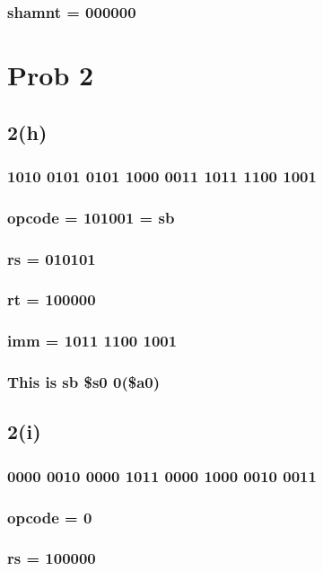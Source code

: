 \documentclass[11pt]{article}
\begin{document}
\subsubsection{shamnt = 000000}
\label{sec:org31a8437}
\section{Prob 2}
\label{sec:org0a354fa}
\subsection{2(h)}
\label{sec:org96f1314}
\subsubsection{1010 0101 0101 1000 0011 1011 1100 1001}
\label{sec:orgfc3d028}
\subsubsection{opcode = 101001 = sb}
\label{sec:org8af76ef}
\subsubsection{rs = 010101}
\label{sec:org305963f}
\subsubsection{rt = 100000}
\label{sec:orgad23dbd}
\subsubsection{imm = 1011 1100 1001}
\label{sec:org52b8803}
\subsubsection{This is sb \$s0 0(\$a0)}
\label{sec:orgb871058}
\subsection{2(i)}
\label{sec:org9ef0fbd}
\subsubsection{0000 0010 0000 1011 0000 1000 0010 0011}
\label{sec:org4b9c534}
\subsubsection{opcode = 0}
\label{sec:org6661af9}
\subsubsection{rs = 100000}
\label{sec:org4111d14}
\end{document}
